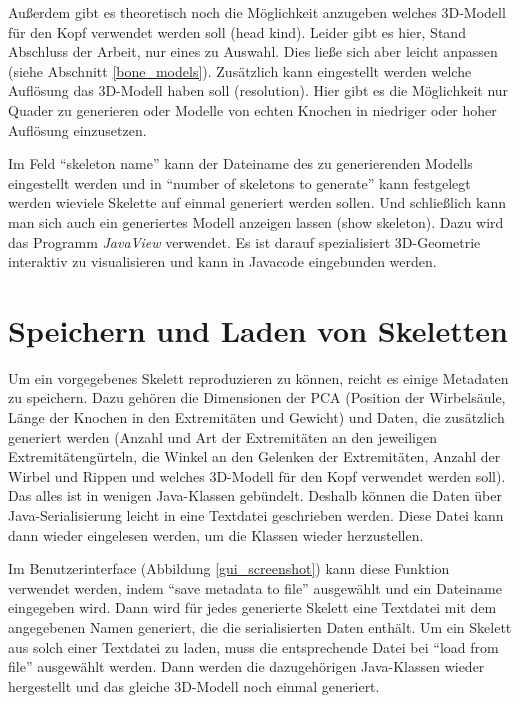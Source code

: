 Außerdem gibt es theoretisch noch die Möglichkeit anzugeben welches 3D-Modell für den Kopf verwendet werden soll (head kind). Leider gibt es hier, Stand Abschluss der Arbeit, nur eines zu Auswahl. Dies ließe sich aber leicht anpassen (siehe Abschnitt \ref{bone_models}).
Zusätzlich kann eingestellt werden welche Auflösung das 3D-Modell haben soll (resolution). Hier gibt es die Möglichkeit nur Quader zu generieren oder Modelle von echten Knochen in niedriger oder hoher Auflösung einzusetzen.

Im Feld "`skeleton name"' kann der Dateiname des zu generierenden Modells eingestellt werden und in "`number of skeletons to generate"' kann festgelegt werden wieviele Skelette auf einmal generiert werden sollen. Und schließlich kann man sich auch ein generiertes Modell anzeigen lassen (show skeleton). Dazu wird das Programm \emph{JavaView} \cite{JavaView} verwendet. Es ist darauf spezialisiert 3D-Geometrie interaktiv zu visualisieren und kann in Javacode eingebunden werden.


\section{Speichern und Laden von Skeletten}
\label{load_skeletons}

Um ein vorgegebenes Skelett reproduzieren zu können, reicht es einige Metadaten zu speichern. Dazu gehören die Dimensionen der PCA (Position der Wirbelsäule, Länge der Knochen in den Extremitäten und Gewicht) und Daten, die zusätzlich generiert werden (Anzahl und Art der Extremitäten an den jeweiligen Extremitätengürteln, die Winkel an den Gelenken der Extremitäten, Anzahl der Wirbel und Rippen und welches 3D-Modell für den Kopf verwendet werden soll).
Das alles ist in wenigen Java-Klassen gebündelt. Deshalb können die Daten über Java-Serialisierung \cite{JavaSerialization} leicht in eine Textdatei geschrieben werden. Diese Datei kann dann wieder eingelesen werden, um die Klassen wieder herzustellen.

Im Benutzerinterface (Abbildung \ref{gui_screenshot}) kann diese Funktion verwendet werden, indem "`save metadata to file"' ausgewählt und ein Dateiname eingegeben wird. Dann wird für jedes generierte Skelett eine Textdatei mit dem angegebenen Namen generiert, die die serialisierten Daten enthält.
Um ein Skelett aus solch einer Textdatei zu laden, muss die entsprechende Datei bei "`load from file"' ausgewählt werden. Dann werden die dazugehörigen Java-Klassen wieder hergestellt und das gleiche 3D-Modell noch einmal generiert.

